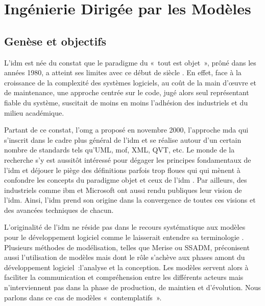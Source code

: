 \chapter{Ingénierie Dirigée par les Modèles}
\label{ch:IDM}
 
\PartialToc

\section{Genèse et objectifs}

L'\gls{idm} est née du constat que le paradigme du «~tout est objet~», prôné dans les années 1980, a atteint ses limites avec ce début de siècle \cite{greenfield2004software}. En effet, face à la croissance de la complexité des systèmes logiciels, au coût de la main d'œuvre et de maintenance, une approche centrée sur le code, jugé alors seul représentant 
fiable du système, suscitait de moins en moins l'adhésion des industriels et du 
milieu académique. 

Partant de ce constat, l'\gls{omg} a proposé en novembre 
2000, l'approche \gls{mda} qui s'inscrit dans le cadre 
plus général de l'\gls{idm} et se réalise autour d'un certain nombre de standards tels 
qu'UML, \gls{mof}, XML, QVT, etc. Le monde de la recherche s'y est aussitôt intéressé 
pour dégager les principes fondamentaux de l'\gls{idm} 
\cite{bezivin2001towards}\cite{kent2002model} \cite{de2002using} et déjouer le 
piège des définitions parfois trop floues qui qui mènent à confondre les 
concepts du paradigme objet et ceux de l'\gls{idm} \cite{bezivin2004search}. Par 
ailleurs, des industriels comme \gls{ibm} \cite{booch2004mda} et Microsoft 
\cite{greenfield2004software} ont aussi rendu publiques leur vision de l'\gls{idm}. 
Ainsi, l'\gls{idm} prend son origine dans la convergence de toutes ces visions et des 
avancées techniques de chacun.

L'originalité de l'\gls{idm} ne réside pas dans le recours systématique aux modèles 
pour le développement logiciel comme le laisserait entendre sa terminologie  
\cite{bezivin2004rapport}. Plusieurs méthodes de modélisation, telles que Merise 
ou SSADM, préconisent aussi l'utilisation de modèles mais dont le rôle s'achève aux 
phases amont du développement logiciel~:l'analyse et la conception. Les modèles 
servent alors à faciliter la communication et compréhension entre les différents 
acteurs mais n'interviennent pas dans la phase de production, de maintien et 
d'évolution. Nous parlons dans ce cas de modèles «~contemplatifs~». 

